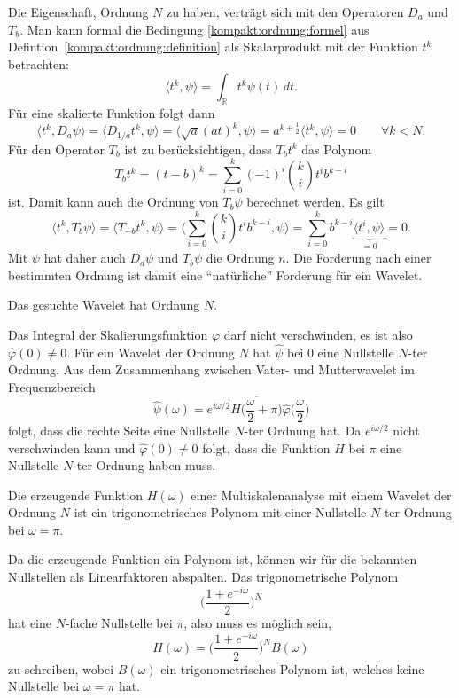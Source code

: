 Die Eigenschaft, Ordnung $N$ zu haben, verträgt sich mit den Operatoren
$D_a$ und $T_b$.
Man kann formal die Bedingung \eqref{kompakt:ordnung:formel} aus
Defintion~\ref{kompakt:ordnung:definition} als Skalarprodukt mit der
Funktion $t^k$ betrachten:
\[
\langle t^k,\psi\rangle = \int_{\mathbb{R}} t^k\psi(t)\,dt.
\]
Für eine skalierte Funktion folgt dann
\[
\langle t^k,D_a\psi\rangle 
=
\langle D_{1/a}t^k,\psi\rangle
=
\langle \sqrt{a}(at)^k,\psi\rangle
=
a^{k+\frac12}\langle t^k,\psi\rangle = 0
\qquad
\forall k<N.
\]
Für den Operator $T_b$ ist zu berücksichtigen, dass $T_bt^k$ das
Polynom
\[
T_bt^k
=
(t-b)^k
=
\sum_{i=0}^k (-1)^i \binom{k}{i}t^ib^{k-i}
\]
ist.
Damit kann auch die Ordnung von $T_b\psi$ berechnet werden.
Es gilt
\[
\langle t^k,T_b\psi\rangle
=
\langle T_{-b}t^k,\psi\rangle
=
\biggl\langle \sum_{i=0}^k \binom{k}{i}t^ib^{k-i},\psi\biggr\rangle
=
\sum_{i=0}^k b^{k-i} \underbrace{\langle t^i,\psi\rangle}_{\displaystyle=0}
=
0.
\]
Mit $\psi$ hat daher auch $D_a\psi$ und $T_b\psi$ die Ordnung $n$.
Die Forderung nach einer bestimmten Ordnung ist damit eine ``natürliche''
Forderung für ein Wavelet.

\begin{forderung}
Das gesuchte Wavelet hat Ordnung $N$.
\end{forderung}

Das Integral der Skalierungsfunktion $\varphi$ darf nicht verschwinden,
es ist also $\hat{\varphi}(0)\ne 0$.
Für ein Wavelet der Ordnung $N$ hat $\hat{\psi}$ bei $0$ eine Nullstelle
$N$-ter Ordnung.
Aus dem Zusammenhang zwischen Vater- und Mutterwavelet im Frequenzbereich
\[
\hat{\psi}(\omega)
=
e^{i\omega/2}
\overline{H\biggl(\frac{\omega}2+\pi\biggr)}
\hat{\varphi}\biggl(\frac{\omega}2\biggr)
\]
folgt, dass die rechte Seite eine Nullstelle $N$-ter Ordnung hat.
Da $e^{i\omega/2}$ nicht verschwinden kann und $\hat{\varphi}(0)\ne 0$ folgt,
dass die Funktion $H$ bei $\pi$ eine Nullstelle $N$-ter
Ordnung haben muss.

\begin{konsequenz}
Die erzeugende Funktion $H(\omega)$ einer Multiskalenanalyse mit einem
Wavelet der Ordnung $N$ ist ein trigonometrisches Polynom mit einer
Nullstelle $N$-ter Ordnung bei $\omega=\pi$.
\end{konsequenz}

Da die erzeugende Funktion ein Polynom ist, können wir für die
bekannten Nullstellen als Linearfaktoren abspalten.
Das trigonometrische Polynom
\[
\biggl(
\frac{1+e^{-i\omega}}{2}
\biggr)^N
\]
hat eine $N$-fache Nullstelle bei $\pi$, also muss es möglich sein,
\begin{equation}
H(\omega)
= 
\biggl(
\frac{1+e^{-i\omega}}{2}
\biggr)^N B(\omega)
\label{buch:kompakt:HB}
\end{equation}
zu schreiben, wobei $B(\omega)$ ein trigonometrisches Polynom ist,
welches keine Nullstelle bei $\omega=\pi$ hat.

